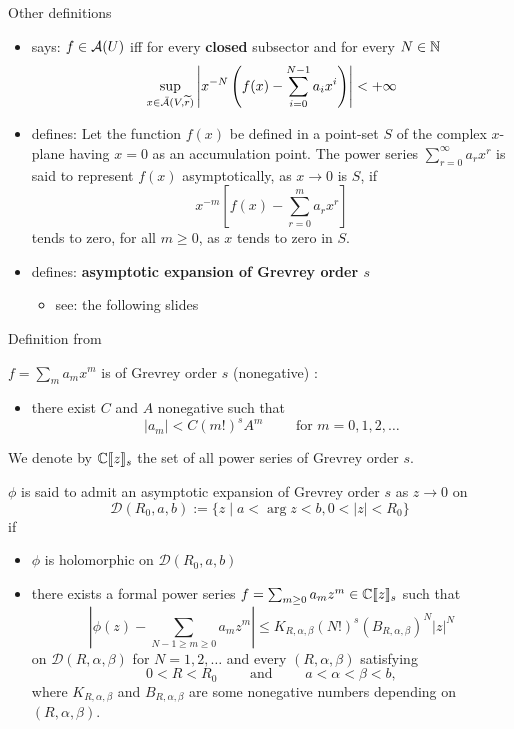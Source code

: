 {
  \begin{frame}{Other definitions}
    \begin{itemize}
      \item \cite[2]{majima1984asymptotic} says:
        $f\in\mathcal{A}(U)$ iff for every \textbf{closed} subsector and for every
        $N\in\mathbb{N}$
        \[
          \sup_{x\in\bar{\mathcal{A}}(V,\widetilde r)}
            \left|x^{-N}\left(f(x)-\sum_{i=0}^{N-1}a_ix^i\right)\right|
          <+\infty
        \]
      \item \cite{wasow2002asymptotic} defines:
        Let the function $f(x)$ be defined in a point-set $S$ of the complex
        $x$-plane having $x=0$ as an accumulation point. The power series
        $\sum_{r=0}^\infty a_rx^r$ is said to represent $f(x)$ asymptotically,
        as $x\to0$ is $S$, if
        \[
          x^{-m}\left[f(x)-\sum_{r=0}^ma_rx^r\right]
        \]
        tends to zero, for all $m\geq0$, as $x$ tends to zero in $S$.
      \item \cite{zbMATH00060600} defines:
        \textbf{asymptotic expansion of Grevrey order $s$}
        \begin{itemize}
          \item see: the following slides
        \end{itemize}
    \end{itemize}
  \end{frame}

  \begin{frame}{Definition from \cite{zbMATH00060600}}
  \begin{defn}
    $f=\sum_ma_mx^m$ is of Grevrey order $s$ (nonegative) :\Leftrightarrow
    \begin{itemize}
      \item there exist $C$ and $A$ nonegative such that
      \[
        |a_m|< C(m!)^sA^m \qquad \text{ for } m=0,1,2,\dots
      \]
    \end{itemize}
    We denote by $\mathbb{C}\llbracket z\rrbracket_s$ the set of all power series of
    Grevrey order $s$.
  \end{defn}
  \begin{defn}
  $\phi$ is said to admit an asymptotic expansion of Grevrey order $s$ as
  $z\to0$ on
  \[
    \mathcal{D}(R_0,a,b):=\{z \mid a < \arg z < b , 0 < |z| < R_0\}
  \]
  if
  \begin{itemize}
    \item $\phi$ is holomorphic on $\mathcal{D}(R_0,a,b)$
    \item there exists a formal power series
    $f=\sum_{m\geq0}a_mz^m \in \mathbb{C}\llbracket z\rrbracket_s$ such that
    \[
      \left|\phi(z)-\sum_{N-1\geq m\geq 0}a_mz^m\right|
      \leq K_{R,\alpha,\beta}(N!)^s(B_{R,\alpha,\beta})^N|z|^N
    \]
    on $\mathcal{D}(R,\alpha,\beta)$ for $N=1,2,\dots$ and every
    $(R,\alpha,\beta)$ satisfying
    \[
      0 < R < R_0 \qquad \text{ and } \qquad a < \alpha < \beta < b,
    \]
    where $K_{R,\alpha,\beta}$ and $B_{R,\alpha,\beta}$ are some nonegative
    numbers depending on $(R,\alpha,\beta)$.
  \end{itemize}
  \end{defn}
  \end{frame}

}

